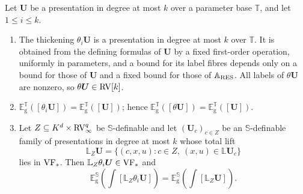 \begin{lem}\label{lem:thickening}
Let $\bm U$ be a presentation in degree at most $k$ over a parameter base
$\mathbb T$, and let $1\leq i\leq k$.
\begin{enumerate}
\item The thickening $\theta_i\bm U$ is a presentation in degree at most $k$
over $\mathbb T$. It is obtained from the defining formulas of $\bm U$ by a
fixed first-order operation, uniformly in parameters, and a bound for its
label fibres depends only on a bound for those of $\bm U$ and a fixed
bound for those of $\bm{\mathbb A}_{\mathrm{RES}}$. All labels of
$\theta\bm U$ are nonzero, so $\theta\bm U\in\mathrm{RV}[k]$.
\item $\mathbb E_{\mathrm g}^{\mathbb T}([\theta_i\bm U])
       =\mathbb E_{\mathrm g}^{\mathbb T}([\bm U])$; hence
$\mathbb E_{\mathrm g}^{\mathbb T}([\theta\bm U])
       =\mathbb E_{\mathrm g}^{\mathbb T}([\bm U])$.
\item Let $Z\subseteq K^d\times\mathrm{RV}_\infty^q$ be $\mathbb S$-definable and let
$(\bm U_c)_{c\in Z}$ be an $\mathbb S$-definable family of presentations in
degree at most $k$ whose total lift
\[
 \mathbb L_Z\bm U=\{(c,x,u):c\in Z,\ (x,u)\in\mathbb L\bm U_c\}
\]
lies in $\mathrm{VF}_*$. Then $\mathbb L_Z\theta_i\bm U\in\mathrm{VF}_*$ and
\[
 \mathbb E_{\mathrm g}^{\mathbb S}\!\left(\int[\mathbb L_Z\theta_i\bm U]\right)
   =\mathbb E_{\mathrm g}^{\mathbb S}\!\left(\int[\mathbb L_Z\bm U]\right).
\]
\end{enumerate}
\end{lem}

